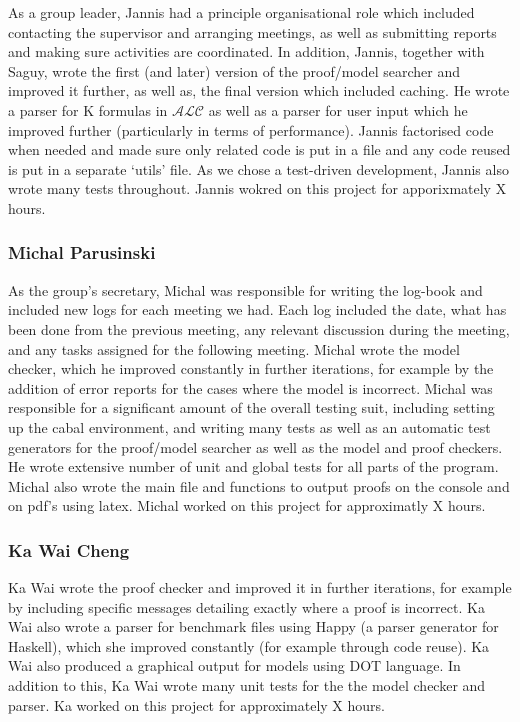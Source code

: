 As a group leader, Jannis had a principle organisational role which included contacting the supervisor and arranging meetings, as well as submitting reports and making sure activities are coordinated. In addition, Jannis, together with Saguy, wrote the first (and later) version of the proof/model searcher and improved it further, as well as, the final version which included caching. He wrote a parser for K formulas in $\mathcal{ALC}$ as well as a parser for user input which he improved further (particularly in terms of performance). Jannis factorised code when needed and made sure only related code is put in a file and any code reused is put in a separate `utils' file. As we chose a test-driven development, Jannis also wrote many tests throughout. Jannis wokred on this project for apporixmately X hours. 

\subsubsection*{Michal Parusinski}

As the group's secretary, Michal was responsible for writing the log-book and included new logs for each meeting we had. Each log included the date, what has been done from the previous meeting, any relevant discussion during the meeting, and any tasks assigned for the following meeting. Michal wrote the model checker, which he improved constantly in further iterations, for example by the addition of error reports for the cases where the model is incorrect. Michal was responsible for a significant amount of the overall testing suit, including setting up the cabal environment, and writing many tests as well as an automatic test generators for the proof/model searcher as well as the model and proof checkers. He wrote extensive number of unit and global tests for all parts of the program. Michal also wrote the main file and functions to output proofs on the console and on pdf's using latex. Michal worked on this project for approximatly X hours.

\subsubsection*{Ka Wai Cheng}

Ka Wai wrote the proof checker and improved it in further iterations, for example by including specific messages detailing exactly where a proof is incorrect. Ka Wai also wrote a parser for benchmark files using Happy (a parser generator for Haskell), which she improved constantly (for example through code reuse). Ka Wai also produced a graphical output for models using DOT language. In addition to this, Ka Wai wrote many unit tests for the the model checker and parser.  Ka worked on this project for approximately X hours. 

